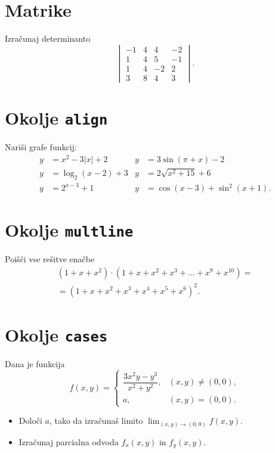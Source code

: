 \documentclass[a4paper,12pt]{article}
\begin{document}
\section*{Matrike}
Izračunaj determinanto
\[
\begin{vmatrix}
   -1 & 4 & 4 & -2 \\
   1 & 4 & 5 & -1 \\
   1 & 4 & -2 & 2 \\
   3 & 8 & 4 & 3
\end{vmatrix}.
\]

\section*{Okolje \texttt{align}}
Nariši grafe funkcij:
\begin{align*}
y &= x^2 - 3|x| + 2 &
y &= 3\sin(\pi+x) - 2 \\
y &= \log_2(x-2) + 3 &
y &= 2\sqrt{x^2+15} + 6 \\
y &= 2^{x-3} + 1 &
y &= \cos(x-3) + \sin^2(x+1).
\end{align*}

\section*{Okolje \texttt{multline}}
Poišči vse rešitve enačbe
\begin{multline*}
(1+x+x^2)\cdot(1+x+x^2+x^3+\ldots+x^9+x^{10}) =\\
=(1+x+x^2+x^3+x^4+x^5+x^6)^2.
\end{multline*}

\section*{Okolje \texttt{cases}}
Dana je funkcija
\[
f(x,y)=
\begin{cases}
\dfrac{3x^2y-y^3}{x^2+y^2}, & (x,y)\neq(0,0),\\
a, & (x,y)=(0,0).
\end{cases}
\]
\begin{itemize}
\item Določi \(a\), tako da izračunaš limito \( \lim_{(x,y)\to(0,0)} f(x,y) \).
\item Izračunaj parcialna odvoda \(f_x(x,y)\) in \(f_y(x,y)\).
\end{itemize}
\end{document}

